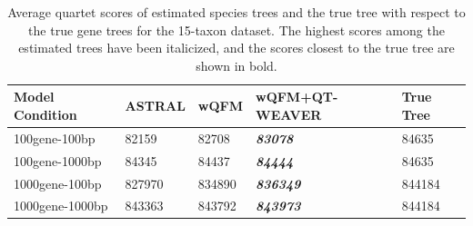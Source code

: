 \documentclass[runningheads]{llncs}
\begin{document}
\begin{appendices}
\begin{table}[h!]
    \centering
    \caption{Average quartet scores of estimated species trees and the true tree with respect to the true gene trees for the 15-taxon dataset. The highest scores among the estimated trees have been italicized, and the scores closest to the true tree are shown in bold.}
    \label{tab:15-quartet-scores-true}
    \begin{tabular}{|C{2.3cm}|C{3cm}|C{3cm}|C{3cm}|C{3cm}|}
        \hline
        \textbf{Model Condition} & \textbf{ASTRAL} & \textbf{wQFM} & \textbf{wQFM+QT-WEAVER} & \textbf{True  Tree} \\
        \hline \hline
        100gene-100bp & 82159 & 82708 & \textbf{\textit{83078}} & 84635 \\
        \hline
        100gene-1000bp & 84345 & 84437 & \textbf{\textit{84444}} & 84635 \\
        \hline
        1000gene-100bp & 827970 & 834890 & \textbf{\textit{836349}} & 844184 \\
        \hline
        1000gene-1000bp & 843363 & 843792 & \textbf{\textit{843973}} & 844184 \\
        \hline
    \end{tabular}
\end{table}



\end{appendices}
\end{document}

